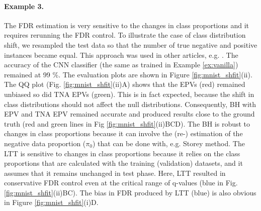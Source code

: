 \documentclass{article}
\begin{document}
\paragraph{Example 3.} The FDR estimation is very sensitive to the changes in class proportions and it requires rerunning the FDR control. To illustrate the case of class distribution shift, we resampled the test data so that the number of true negative and positive instances became equal. This approach was used in other articles, e.g.  \cite{joseph_d__viviano__2019}. The accuracy of the CNN classifier (the same as trained in Example \ref{ex:vanilla}) remained at 99 \%. The evaluation plots are shown in Figure \ref{fig:mnist_shfit}(ii). The QQ plot (Fig. \ref{fig:mnist_shfit}(ii)A) shows that the EPVs (red) remained unbiased so did TNA EPVs (green). This is in  fact expected, because the shift in class distributions should not affect the null distributions. Consequently, BH with EPV and TNA EPV remained accurate and produced results close to the ground truth (red and green lines in Fig \ref{fig:mnist_shfit}(ii)BCD). The BH is robust to changes in class proportions because it can involve the (re-) estimation of the negative data proportion ($\pi_0$) that can be done with, e.g. Storey method. The LTT is sensitive to changes in class proportions because it relies on the class proportions that are calculated with the training (validation) datasets, and it assumes that it remains unchanged in test phase. Here, LTT resulted in conservative FDR control even at the critical range of q-values (blue in Fig. \ref{fig:mnist_shfit}(ii)BC). The bias in FDR produced by LTT (blue) is also obvious in Figure \ref{fig:mnist_shfit}(i)D. 



\end{document}
